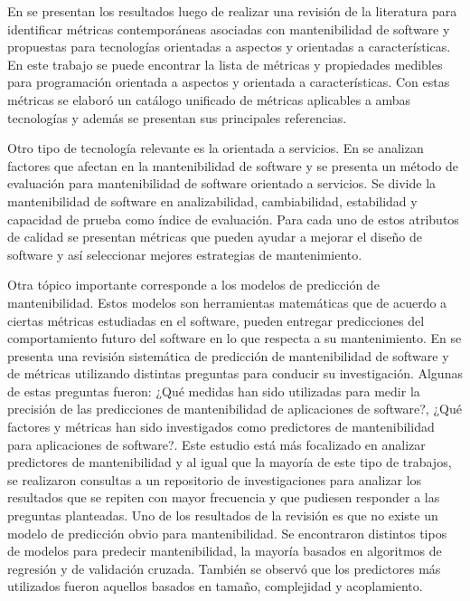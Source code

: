  En \cite{SystematicReview} se presentan los resultados luego de realizar
 una revisión de la literatura para identificar métricas contemporáneas
 asociadas con mantenibilidad de software y propuestas para tecnologías
 orientadas a aspectos y orientadas a características. En este trabajo
 se puede encontrar la lista de métricas y propiedades medibles para programación
 orientada a aspectos y orientada a características. Con estas métricas se
 elaboró un catálogo unificado de métricas aplicables a ambas tecnologías
 y además se presentan sus principales referencias.

 Otro tipo de tecnología relevante es la orientada a servicios. En
 \cite{ResearchOnMaintainability} se analizan factores que afectan en la mantenibilidad
 de software y se presenta un método de evaluación para mantenibilidad de software
 orientado a servicios. Se divide la mantenibilidad de software en analizabilidad,
cambiabilidad, estabilidad y capacidad de prueba como índice de evaluación. Para
cada uno de estos atributos de calidad se presentan métricas que pueden ayudar
a mejorar el diseño de software y así seleccionar mejores estrategias de mantenimiento.

Otra tópico importante corresponde a los modelos de predicción de mantenibilidad.
Estos modelos son herramientas matemáticas que de acuerdo a ciertas métricas
estudiadas en el software, pueden entregar predicciones del comportamiento futuro
del software en lo que respecta a su mantenimiento.
En \cite{Riaz:2009} se presenta una revisión sistemática de predicción de mantenibilidad
de software y de métricas utilizando distintas preguntas para conducir su investigación.
Algunas de estas preguntas fueron: ¿Qué medidas han sido utilizadas para
medir la precisión de las predicciones de mantenibilidad de aplicaciones de software?,
¿Qué factores y métricas han sido investigados como predictores de mantenibilidad
para aplicaciones de software?. Este estudio está más focalizado en analizar
predictores de mantenibilidad y al igual que la mayoría de este tipo de trabajos,
se realizaron consultas a un repositorio de investigaciones para
analizar los resultados que se repiten con mayor frecuencia y que pudiesen responder
a las preguntas planteadas.
Uno de los resultados de la revisión es que no existe un modelo de predicción
obvio para mantenibilidad. Se encontraron distintos tipos de modelos para predecir
mantenibilidad, la mayoría basados en algoritmos de regresión y de validación
cruzada. También se observó que los predictores más utilizados fueron aquellos
basados en tamaño, complejidad y acoplamiento.

